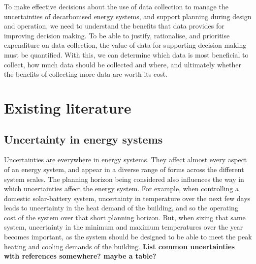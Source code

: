 To make effective decisions about the use of data collection to manage the uncertainties of decarbonised energy systems, and support planning during design and operation, we need to understand the benefits that data provides for improving decision making. To be able to justify, rationalise, and prioritise expenditure on data collection, the value of data for supporting decision making must be quantified. With this, we can determine which data is most beneficial to collect, how much data should be collected and where, and ultimately whether the benefits of collecting more data are worth its cost.



\newpage
\section{Existing literature}


\subsection{Uncertainty in energy systems} \label{sec:uncertainties-lit}


Uncertainties are everywhere in energy systems. They affect almost every aspect of an energy system, and appear in a diverse range of forms across the different system scales. The planning horizon being considered also influences the way in which uncertainties affect the energy system. For example, when controlling a domestic solar-battery system, uncertainty in temperature over the next few days leads to uncertainty in the heat demand of the building, and so the operating cost of the system over that short planning horizon. But, when sizing that same system, uncertainty in the minimum and maximum temperatures over the year becomes important, as the system should be designed to be able to meet the peak heating and cooling demands of the building.
\textbf{List common uncertainties with references somewhere? maybe a table?}

